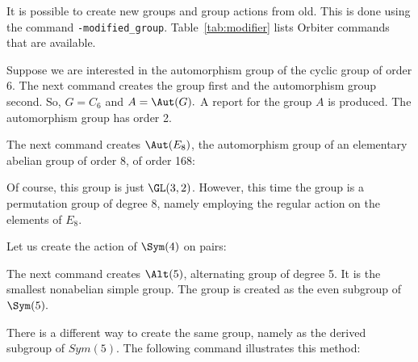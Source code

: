 
It is possible to create new groups and group actions from old. 
This is done using the command \verb'-modified_group'.
Table~\ref{tab:modifier} lists Orbiter commands that are available.



Suppose we are interested in the automorphism group of the cyclic group of order 6.
The next command creates the group first and the automorphism group second.
So, $G = C_6$ and $A = \Aut(G).$ 
A report for the group $A$ is produced. 
The automorphism group has order 2.



\bigskip


The next command creates $\Aut(E_8)$, 
the automorphism group of an elementary abelian group of order 8, 
of order 168:



Of course, this group is just $\GL(3,2)$. 
However, this time the group is a permutation group of degree $8$, 
namely employing the regular action on the elements of $E_8$. 

\bigskip




Let us create the action of $\Sym(4)$ on pairs:


\bigskip



The next command creates $\Alt(5)$, 
alternating group of degree 5. It is the smallest nonabelian simple group. 
The group is created as the even subgroup of $\Sym(5).$


\bigskip


There is a different way to create the same group, namely as the derived subgroup of 
$Sym(5).$ The following command illustrates this method: 


\bigskip





